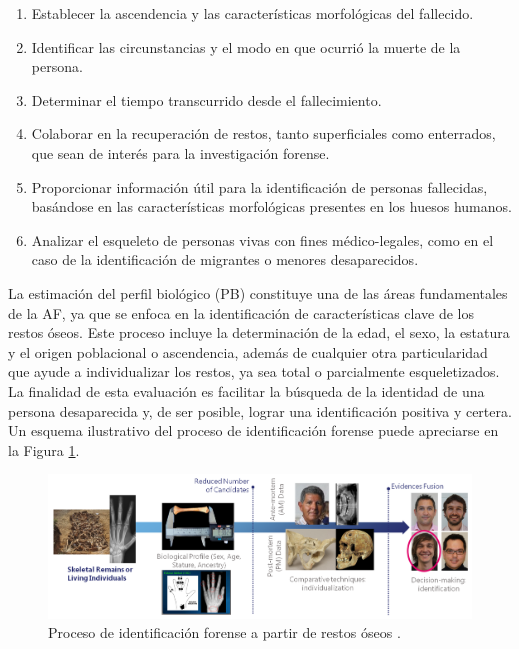 \begin{enumerate}
    \item Establecer la ascendencia y las características morfológicas del fallecido.
    \item Identificar las circunstancias y el modo en que ocurrió la muerte de la persona.
    \item Determinar el tiempo transcurrido desde el fallecimiento.
    \item Colaborar en la recuperación de restos, tanto superficiales como enterrados, que sean de interés para la investigación forense.
    \item Proporcionar información útil para la identificación de personas fallecidas, basándose en las características morfológicas presentes en los huesos humanos.
    \item Analizar el esqueleto de personas vivas con fines médico-legales, como en el caso de la identificación de migrantes o menores desaparecidos.
\end{enumerate}

La estimación del perfil biológico (PB) constituye una de las áreas fundamentales de la AF, ya que se enfoca en la identificación de características clave de los restos óseos. Este proceso incluye la determinación de la edad, el sexo, la estatura y el origen poblacional o ascendencia, además de cualquier otra particularidad que ayude a individualizar los restos, ya sea total o parcialmente esqueletizados. La finalidad de esta evaluación es facilitar la búsqueda de la identidad de una persona desaparecida y, de ser posible, lograr una identificación positiva y certera. Un esquema ilustrativo del proceso de identificación forense puede apreciarse en la Figura \ref{fig:intro_1}.

\begin{figure}[h]
    \centering
    \includegraphics[width=1\linewidth]{figures/1_introduction/intro_1.png}
    \caption[Proceso de identificación forense a partir de restos óseos]{Proceso de identificación forense a partir de restos óseos \cite{RefWorks:RefID:21-mesejo2020survey}.}
    \label{fig:intro_1}
\end{figure}

